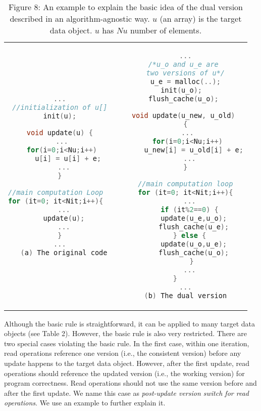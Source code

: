 \begin{table}
\centering
\small
\begin{tabular}{c p{0.1cm} c}
  \begin{lstlisting}[language=c++]
...
//initialization of u[]
init(u);

void update(u) {
  ... 
  for(i=0;i<Nu;i++) 
    u[i] = u[i] + e;
  ...
}

//main computation Loop  
for (it=0; it<Nit;i++){  
  ...
  update(u);
  ...
}
...
  (a) The original code
\end{lstlisting}
& 
& \begin{lstlisting}[language=c++]
...
/*u_o and u_e are 
two versions of u*/
u_e = malloc(..);
init(u_o);  
flush_cache(u_o); 

void update(u_new, u_old) 
{
  ... 
  for(i=0;i<Nu;i++) 
    u_new[i] = u_old[i] + e;
  ...
}

//main computation loop
for (it=0; it<Nit;i++){
  ...
  if (it%2==0) {
    update(u_e,u_o);
    flush_cache(u_e);
  } else {
    update(u_o,u_e);
    flush_cache(u_o);
   }
  ...
}     
...
(b) The dual version
\end{lstlisting}\\
\end{tabular}
\caption*{Figure 8: An example to explain the basic idea of the dual version described in an algorithm-agnostic way. $u$ (an array) is the target data object. $u$ has $Nu$ number of elements.}
\label{table:basic_rule}
\vspace{-20pt}
\end{table}

Although the basic rule is straightforward, it can be applied to many 
target data objects (see Table 2). However, the basic rule is also
very restricted. 
There are two special cases violating the basic rule.
In the first case, within one iteration, read operations reference one version (i.e., the consistent version) before any update happens to the target data object.
However, after the first update, read operations should reference the updated version (i.e., the working version) for program correctness. Read operations should not use the same version before and after the first update.
We name this case as \textit{post-update version switch for read operations}. We use an example to further explain it. 

\begin{comment}
To apply the basic rule, the target data object 
must be updated uniformly. Also,
the basic rule suggests that read operations should always use
the same version of the target data objects within an iteration, which is not 
valid if there is any update happened to the target data object. 
We discuss two cases that violate the basic rules as follows.
\end{comment}

